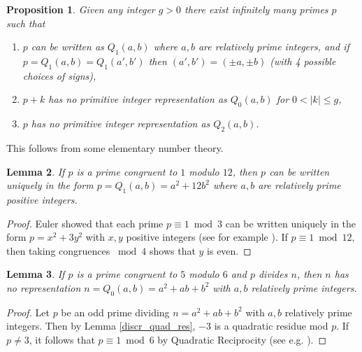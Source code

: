 \documentclass[reqno]{amsproc}  %
\newtheorem{prop}{\bf Proposition}[section]
\newtheorem{lem}[prop]{\bf Lemma}
\begin{document}
\newpage
\begin{prop}  \label{p_with_big_gap}
Given any integer $g >0$ there exist infinitely many primes $p$ such that
\begin{enumerate}
\item[(i)] 
$p$ can be written as $Q_1(a,b)$ where $a,b$ are relatively prime integers,
and if $p=Q_1(a,b)=Q_1(a',b')$ then $(a',b') = (\pm a, \pm b)$ (with 4 possible choices of signs),
\item[(ii)] $p+k$ has no primitive integer representation as $Q_0(a,b)$ for $0<|k|\le g$,
\item[(iii)] $p$ has no primitive integer representation as $Q_2(a,b)$.
\end{enumerate}
\end{prop}

This follows from some elementary number theory.

\begin{lem} \label{p=1mod12} If $p$ is a prime congruent to $1$ modulo $12$, 
then $p$ can be written uniquely in the form
     $p= Q_1(a,b) = a^2 + 12 b^2$
where $a,b$ are relatively prime positive integers.
\end{lem}

\begin{proof}
Euler showed that each prime $p \equiv 1 \bmod 3$ can be written uniquely in the form
$p = x^2 + 3 y^2$ with $x,y$ positive integers (see for example \cite[Chapter 1]{cox}).
If $p \equiv 1 \bmod 12$, then taking congruences $\bmod 4$ shows that $y$ is even.
\end{proof}

\begin{lem} \label{p=5mod6} If $p$ is a prime congruent to  $5$ modulo $6$ and $p$ divides $n$,
then $n$ has no representation
$n = Q_0(a,b)=a^2 + ab + b^2$ with $a,b$ relatively prime integers.
\end{lem}

\begin{proof} Let $p$ be an odd prime dividing $n = a^2 + ab + b^2$
with $a,b$ relatively prime integers.
Then by Lemma \ref{discr_quad_res},
$-3$ is a quadratic residue mod $p$. If $p \ne 3$, it follows that
 $p \equiv 1 \bmod 6$ by Quadratic Reciprocity 
(see e.g. \cite[Thm 96]{HaWr}). 
\end{proof}
\end{document}
